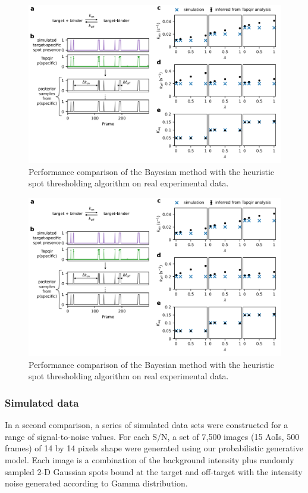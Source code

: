 \begin{figure}
\includegraphics[width=\linewidth]{figures/figure6/figure6.png}
\caption{Performance comparison of the Bayesian method with the heuristic spot thresholding algorithm on real experimental data.}
\label{fig:real_data}
\end{figure}

\begin{figure}
\includegraphics[width=\linewidth]{figures/figure6/figure6.png}
\caption{Performance comparison of the Bayesian method with the heuristic spot thresholding algorithm on real experimental data.}
\label{fig:real_data}
\end{figure}

\subsubsection{Simulated data}

In a second comparison, a series of simulated data sets were constructed for a range of signal-to-noise values. For each S/N, a set of 7,500 images (15 AoIs, 500 frames) of 14 by 14 pixels shape were generated using our probabilistic generative model. Each image is a combination of the background intensity plus randomly sampled 2-D Gaussian spots bound at the target and off-target with the intensity noise generated according to Gamma distribution.

